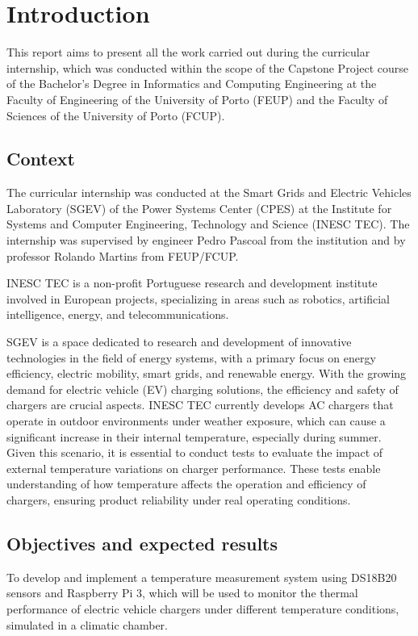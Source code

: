 \section{Introduction}

This report aims to present all the work carried out during the curricular 
internship, which was conducted within the scope of the Capstone Project
course of the Bachelor’s Degree in Informatics and Computing Engineering at 
the Faculty of Engineering of the University of Porto (FEUP) and the Faculty of Sciences of the University of Porto (FCUP).


\subsection{Context}
The curricular internship was conducted at the Smart Grids and Electric Vehicles Laboratory (SGEV) of the Power Systems Center (CPES) at the 
Institute for Systems and Computer Engineering, Technology and Science (INESC TEC). The internship was supervised by engineer Pedro Pascoal from 
the institution and by professor Rolando Martins from FEUP/FCUP.

INESC TEC is a non-profit Portuguese research and development institute 
involved in European projects, specializing in areas such as robotics, 
artificial intelligence, energy, and telecommunications.

SGEV is a space dedicated to research and development of innovative technologies in the field of energy systems, with a primary focus on energy 
efficiency, electric mobility, smart grids, and renewable energy.
With the growing demand for electric vehicle (EV) charging solutions, the efficiency and safety of chargers are crucial aspects. INESC TEC currently develops 
AC chargers that operate in outdoor environments under weather exposure, which can cause a significant increase in their internal temperature, 
especially during summer. Given this scenario, it is essential to conduct tests to evaluate the impact of external temperature variations on 
charger performance. These tests enable understanding of how temperature affects the operation and efficiency of chargers, ensuring 
product reliability under real operating conditions.

\subsection{Objectives and expected results}
To develop and implement a temperature measurement system using DS18B20 sensors and Raspberry Pi 3, which will be used to monitor the thermal 
performance of electric vehicle chargers under different temperature conditions, simulated in a climatic chamber.

